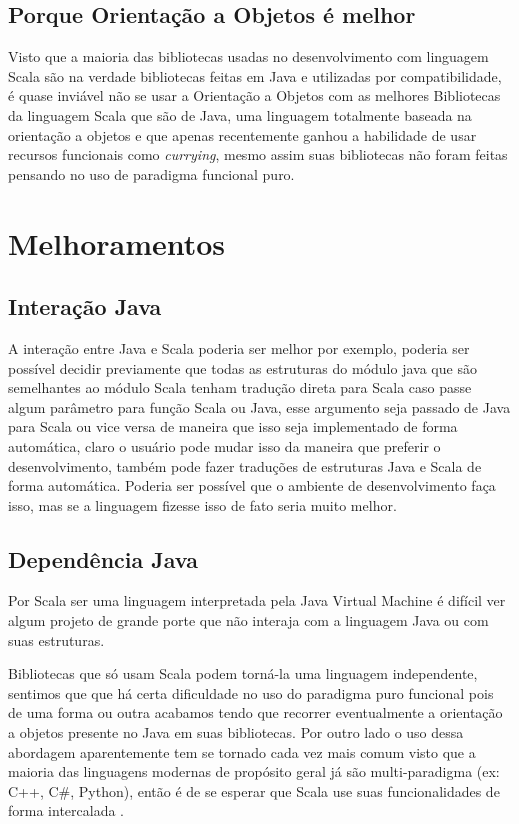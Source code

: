 \documentclass[rel-mlp]{iiufrgs}
\begin{document}
\section{Porque Orientação a Objetos é melhor}

  Visto que a maioria das bibliotecas usadas no desenvolvimento com linguagem Scala são na verdade bibliotecas feitas em Java e utilizadas por compatibilidade, é quase inviável não se usar a Orientação a Objetos com as melhores Bibliotecas da linguagem Scala que são de Java, uma linguagem totalmente baseada na orientação a objetos e que apenas recentemente ganhou a habilidade de usar recursos funcionais como \textit{currying}, mesmo assim suas bibliotecas não foram feitas pensando no uso de paradigma funcional puro.


\chapter{Melhoramentos}

\section{Interação Java}
 A interação entre Java e Scala poderia ser melhor por exemplo, poderia ser possível decidir previamente que todas as estruturas do módulo java que são semelhantes ao módulo Scala tenham tradução direta para Scala caso passe algum parâmetro para função Scala ou Java, esse argumento seja passado de Java para Scala ou vice versa de maneira que isso seja implementado de forma automática, claro o usuário pode mudar isso da maneira que preferir o desenvolvimento, também pode fazer traduções de estruturas Java e Scala de forma automática. Poderia ser possível que o ambiente de desenvolvimento faça isso, mas se a linguagem fizesse isso de fato seria muito melhor.

\section{Dependência Java}
 Por Scala ser uma linguagem interpretada pela Java Virtual Machine é difícil ver algum projeto de grande porte que não interaja com a linguagem Java ou com suas estruturas.

 Bibliotecas que só usam Scala podem torná-la uma linguagem independente, sentimos que que há certa dificuldade no uso do paradigma puro funcional pois de uma forma ou outra acabamos tendo que recorrer eventualmente a orientação a objetos presente no Java em suas bibliotecas. Por outro lado o uso dessa abordagem aparentemente tem se tornado cada vez mais comum visto que a maioria das linguagens modernas de propósito geral já são multi-paradigma (ex: C++, C\#, Python), então é de se esperar que Scala use suas funcionalidades de forma intercalada \cite{stack}.
\end{document}
